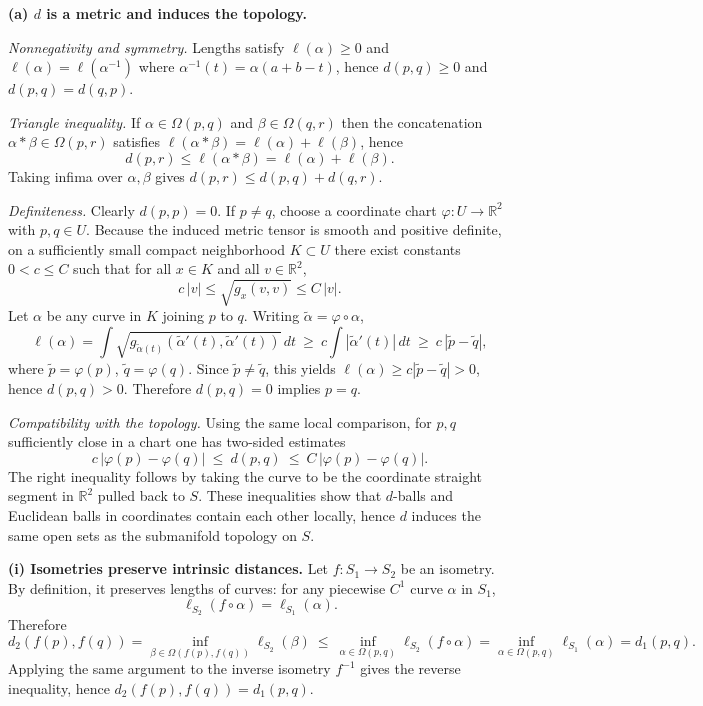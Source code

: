 \begin{solution}
\smallskip
	\textbf{(a) $d$ is a metric and induces the topology.}
	
	\emph{Nonnegativity and symmetry.}
	Lengths satisfy $\ell(\alpha)\ge 0$ and $\ell(\alpha)=\ell(\alpha^{-1})$ where $\alpha^{-1}(t)=\alpha(a+b-t)$, hence
	$d(p,q)\ge 0$ and $d(p,q)=d(q,p)$.
	
	\emph{Triangle inequality.}
	If $\alpha\in\Omega(p,q)$ and $\beta\in\Omega(q,r)$ then the concatenation $\alpha*\beta\in\Omega(p,r)$ satisfies
	$\ell(\alpha*\beta)=\ell(\alpha)+\ell(\beta)$, hence
	\[
	d(p,r)\le \ell(\alpha*\beta)=\ell(\alpha)+\ell(\beta).
	\]
	Taking infima over $\alpha,\beta$ gives $d(p,r)\le d(p,q)+d(q,r)$.
	
	\emph{Definiteness.}
	Clearly $d(p,p)=0$. If $p\neq q$, choose a coordinate chart $\varphi:U\to\mathbb R^2$ with $p,q\in U$.
	Because the induced metric tensor is smooth and positive definite, on a sufficiently small compact neighborhood $K\subset U$
	there exist constants $0<c\le C$ such that for all $x\in K$ and all $v\in\mathbb R^2$,
	\[
	c\,|v| \le \sqrt{g_x(v,v)} \le C\,|v|.
	\]
	Let $\alpha$ be any curve in $K$ joining $p$ to $q$. Writing $\tilde\alpha=\varphi\circ\alpha$,
	\[
	\ell(\alpha)=\int \sqrt{g_{\tilde\alpha(t)}(\tilde\alpha'(t),\tilde\alpha'(t))}\,dt
	\ \ge\ c\int |\tilde\alpha'(t)|\,dt \ \ge\ c\,|\tilde p-\tilde q|,
	\]
	where $\tilde p=\varphi(p)$, $\tilde q=\varphi(q)$. Since $\tilde p\neq\tilde q$, this yields $\ell(\alpha)\ge c|\tilde p-\tilde q|>0$,
	hence $d(p,q)>0$. Therefore $d(p,q)=0$ implies $p=q$.
	
	\emph{Compatibility with the topology.}
	Using the same local comparison, for $p,q$ sufficiently close in a chart one has two-sided estimates
	\[
	c\,|\varphi(p)-\varphi(q)| \ \le\ d(p,q) \ \le\ C\,|\varphi(p)-\varphi(q)|.
	\]
	The right inequality follows by taking the curve to be the coordinate straight segment in $\mathbb R^2$ pulled back to $S$.
	These inequalities show that $d$-balls and Euclidean balls in coordinates contain each other locally, hence $d$ induces the same
	open sets as the submanifold topology on $S$.
	
	\smallskip
	\textbf{(i) Isometries preserve intrinsic distances.}
	Let $f:S_1\to S_2$ be an isometry. By definition, it preserves lengths of curves:
	for any piecewise $C^1$ curve $\alpha$ in $S_1$,
	\[
	\ell_{S_2}(f\circ \alpha)=\ell_{S_1}(\alpha).
	\]
	Therefore
	\[
	d_2(f(p),f(q))
	=
	\inf_{\beta\in\Omega(f(p),f(q))}\ell_{S_2}(\beta)
	\ \le\
	\inf_{\alpha\in\Omega(p,q)} \ell_{S_2}(f\circ\alpha)
	=
	\inf_{\alpha\in\Omega(p,q)} \ell_{S_1}(\alpha)
	=
	d_1(p,q).
	\]
	Applying the same argument to the inverse isometry $f^{-1}$ gives the reverse inequality, hence
	$d_2(f(p),f(q))=d_1(p,q)$.
	

\end{solution}
